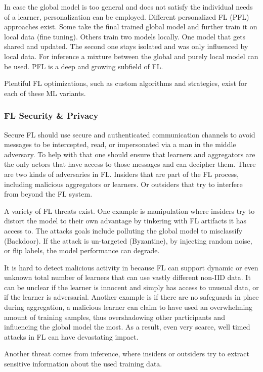 In case the global model is too general and does not satisfy the individual needs
of a learner, personalization can be employed.
Different personalized FL (PFL) approaches exist.
Some take the final trained global model and further train it on local data (fine tuning).
Others train two models locally.
One model that gets shared and updated.
The second one stays isolated and was only influenced by local data.
For inference a mixture between the global and purely local model can be used.
PFL is a deep and growing subfield of FL.

Plentiful FL optimizations, such as custom algorithms and strategies,
exist for each of these ML variants.

\subsubsection{FL Security \& Privacy}
Secure FL should use secure and authenticated
communication channels to avoid messages to be intercepted,
read, or impersonated via a man in the middle adversary.
To help with that one should ensure that 
learners and aggregators are the only actors that have
access to those messages and can decipher them.
There are two kinds of adversaries in FL.
Insiders that are part of the FL process, including
malicious aggregators or learners.
Or outsiders that try to interfere from beyond the FL system.

A variety of FL threats exist.
One example is manipulation where insiders try to distort
the model to their own advantage by tinkering with FL artifacts
it has access to.
The attacks goals include polluting the global model
to misclassify (Backdoor).
If the attack is un-targeted (Byzantine), by injecting random noise,
or flip labels, the model performance can degrade.

It is hard to detect malicious activity in because
FL can support dynamic or even unknown total number of learners
that can use vastly different non-IID data.
It can be unclear if the learner is innocent and simply has
access to unusual data, or if the learner is adversarial.
Another example is if there are no safeguards in place during aggregation,
a malicious learner can claim to have used an overwhelming amount of training samples,
thus overshadowing other participants and influencing the global model the most.
As a result, even very scarce, well timed attacks in FL can have devastating impact.

Another threat comes from inference, where 
insiders or outsiders try to extract sensitive information
about the used training data.
